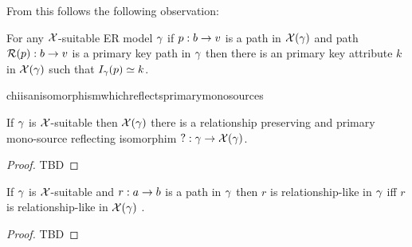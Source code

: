 From this follows the following observation:

\begin{observation}
\label{pathinjectionobservation}
For any $\mathcal{X}$-suitable ER model $\gamma$ if $p:b \rightarrow v$ is a path in $\mathcal{X}(\gamma)$ and  path $\mathcal{R}(p):b \rightarrow v$ is a primary key path in $\gamma$  then there is an primary key attribute $k$ in $\mathcal{X}(\gamma)$ such that $I_\gamma(p) \simeq k$. 
\end{observation}

chiisanisomorphismwhichreflectsprimarymonosources
\begin{lemma}
\label{chiisanisomorphismwhichreflectsprimarymonosources}
If $\gamma$ is $\mathcal{X}$-suitable  then $\mathcal{X}(\gamma)$ there is a relationship preserving and primary mono-source reflecting isomorphim $?: \gamma \rightarrow \mathcal{X}(\gamma)$.
\end{lemma}
\begin{proof}
TBD 
\end{proof}

\begin{lemma}
\label{relationshiplikecarrythroughlemma}
If $\gamma$ is $\mathcal{X}$-suitable  and $r:a \rightarrow b$ is a path in $\gamma$ then $r$ is relationship-like in $\gamma$ iff $r$ is relationship-like in $\mathcal{X}(\gamma)$ .
\end{lemma}
\begin{proof}
TBD
\end{proof}

